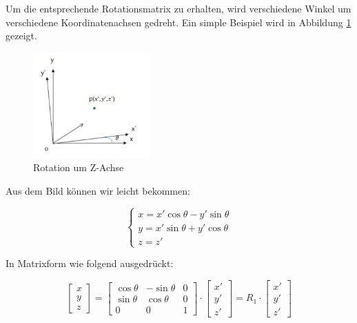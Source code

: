 Um die entsprechende Rotationsmatrix zu erhalten, wird verschiedene Winkel um verschiedene Koordinatenachsen gedreht. Ein simple Beispiel wird in Abbildung \ref{fig:rotation} gezeigt.

\begin{figure}[H]
 \centering 
 \includegraphics[keepaspectratio,width=0.4\textwidth]{images/3_Ersteverfahren/Kamera/rotationsmatrix.pdf}
 \caption{Rotation um Z-Achse}
 \label{fig:rotation}
\end{figure} 

Aus dem Bild können wir leicht bekommen:

\begin{equation}
   \begin{cases} 
	x = x'\cos\theta - y'\sin\theta \\	
	y = x'\sin\theta + y'\cos\theta \\
	z = z'
	\end{cases}
\end{equation}

In Matrixform wie folgend ausgedrückt:

\begin{equation}
   \begin{bmatrix}
	x \\  
	y \\
	z
	\end{bmatrix} = \begin{bmatrix}
	\cos\theta & -\sin\theta & 0	\\
	\sin\theta & \cos\theta  & 0	\\
	0    	   & 0           & 1	
	\end{bmatrix} \cdot \begin{bmatrix}
	x' \\  
	y' \\
	z'
	\end{bmatrix}= R_1 \cdot \begin{bmatrix}
	x' \\  
	y' \\
	z'
	\end{bmatrix}
\end{equation}

